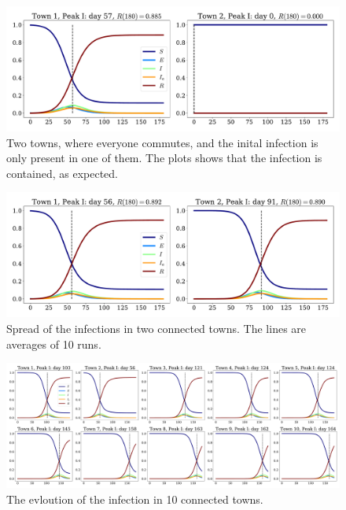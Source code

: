 \documentclass{article}
\begin{document}
    \begin{figure}[H]
        \centering
        \includegraphics[width=.7\textwidth]{../plots/2D/two_towns2.pdf}
        \caption{Two towns, where everyone commutes, and the inital infection is only present in one of them. The plots shows that the infection is contained, as expected.}
        \label{All commuters}
    \end{figure}

    \begin{figure}[H]
        \centering
        \includegraphics[width=.7\textwidth]{../plots/2D/two_towns.pdf}
        \caption{Spread of the infections in two connected towns. The lines are averages of 10 runs.}
        \label{two towns}
    \end{figure}

    \begin{figure}[H]
        \centering
        \includegraphics[width=\textwidth]{../plots/2D/nine_towns.pdf}
        \caption{The evloution of the infection in 10 connected towns.}
        \label{nine towns}
    \end{figure}
\end{document}
